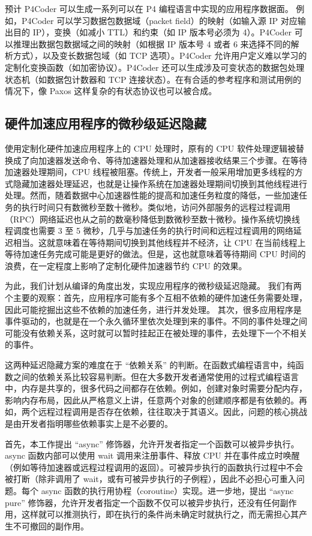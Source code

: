 预计 P4Coder 可以生成一系列可以在 P4 编程语言中实现的应用程序数据面。
例如，P4Coder 可以学习数据包数据域（packet field）的映射（如输入源 IP 对应输出目的 IP），变换（如减小 TTL）和约束（如 IP 版本号必须为 4）。P4Coder 可以推理出数据包数据域之间的映射（如根据 IP 版本号 4 或者 6 来选择不同的解析方式），以及变长数据包域（如 TCP 选项）。P4Coder 允许用户定义难以学习的定制化变换函数（如加密协议）。P4Coder 还可以生成涉及可变状态的数据包处理状态机（如数据包计数器和 TCP 连接状态）。在有合适的参考程序和测试用例的情况下，像 Paxos 这样复杂的有状态协议也可以被合成。

\subsection{硬件加速应用程序的微秒级延迟隐藏}

使用定制化硬件加速应用程序上的 CPU 处理时，原有的 CPU 软件处理逻辑被替换成了向加速器发送命令、等待加速器处理和从加速器接收结果三个步骤。在等待加速器处理期间，CPU 线程被阻塞。传统上，开发者一般采用增加更多线程的方式隐藏加速器处理延迟，也就是让操作系统在加速器处理期间切换到其他线程进行处理。然而，随着数据中心加速器性能的提高和加速任务粒度的降低，一些加速任务的执行时间只有数微秒至数十微秒。类似地，访问外部服务的远程过程调用（RPC）网络延迟也从之前的数毫秒降低到数微秒至数十微秒。操作系统切换线程调度也需要 3 至 5 微秒，几乎与加速任务的执行时间和远程过程调用的网络延迟相当。这就意味着在等待期间切换到其他线程并不经济，让 CPU 在当前线程上等待加速任务完成可能是更好的做法。但是，这也就意味着等待期间 CPU 时间的浪费，在一定程度上影响了定制化硬件加速器节约 CPU 的效果。

为此，我们计划从编译的角度出发，实现应用程序的微秒级延迟隐藏。
我们有两个主要的观察：首先，应用程序可能有多个互相不依赖的硬件加速任务需要处理，因此可能挖掘出这些不依赖的加速任务，进行并发处理。
其次，很多应用程序是事件驱动的，也就是在一个永久循环里依次处理到来的事件。不同的事件处理之间可能没有依赖关系，这时就可以暂时挂起正在被处理的事件，去处理下一个不相关的事件。

这两种延迟隐藏方案的难度在于 ``依赖关系'' 的判断。在函数式编程语言中，纯函数之间的依赖关系比较容易判断。但在大多数开发者通常使用的过程式编程语言中，内存是共享的，很多代码之间都存在依赖。例如，创建对象时需要分配内存，影响内存布局，因此从严格意义上讲，任意两个对象的创建顺序都是有依赖的。再如，两个远程过程调用是否存在依赖，往往取决于其语义。因此，问题的核心挑战是由开发者指明哪些依赖事实上是不必要的。

首先，本工作提出 ``async'' 修饰器，允许开发者指定一个函数可以被异步执行。async 函数内部可以使用 wait 调用来注册事件、释放 CPU 并在事件成立时唤醒（例如等待加速器或远程过程调用的返回）。可被异步执行的函数执行过程中不会被打断（除非调用了 wait，或有可被异步执行的子例程），因此不必担心可重入问题。每个 async 函数的执行用协程（coroutine）实现。进一步地，提出 ``async pure'' 修饰器，允许开发者指定一个函数不仅可以被异步执行，还没有任何副作用，这样就可以推测执行，即在执行的条件尚未确定时就执行之，而无需担心其产生不可撤回的副作用。

